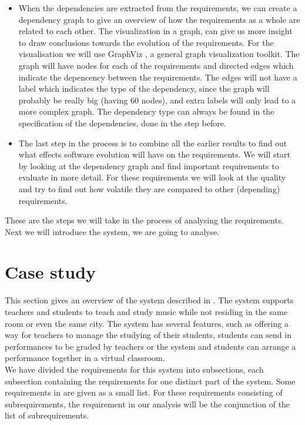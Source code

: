 \documentclass[a4paper,11pt]{article}
\begin{document}
\begin{itemize}
			\item When the dependencies are extracted from the requirements, we can create a dependency graph to give an overview of how the requirements as a whole are related to each other. The visualization in a graph, can give us more insight to draw conclusions towards the evolution of the requirements. For the visualisation we will use GraphViz \cite{graphviz}, a general graph visualization toolkit. The graph will have nodes for each of the requirements and directed edges which indicate the depencency between the requirements. The edges will not have a label which indicates the type of the dependency, since the graph will probably be really big (having 60 nodes), and extra labels will only lead to a more complex graph. The dependency type can always be found in the specification of the dependencies, done in the step before.
			\item The last step in the process is to combine all the earlier results to find out what effects software evolution will have on the requirements. We will start by looking at the dependency graph and find important requirements to evaluate in more detail. For these requirements we will look at the quality and try to find out how volatile they are compared to other (depending) requirements.
		\end{itemize} 
		
		These are the steps we will take in the process of analysing the requirements. Next we will introduce the system, we are going to analyse.
	
	\section{Case study}
	\label{sec:case}
		This section gives an overview of the system described in \cite{VEMUS}. The system supports teachers and students to teach and study music while not residing in the same room or even the same city. The system has several features, such as offering a way for teachers to manage the studying of their students, students can send in performances to be graded by teachers or the system and students can arrange a performance together in a virtual classroom. \\
		We have divided the requirements for this system into subsections, each subsection containing the requirements for one distinct part of the system. Some requirements in \cite{VEMUS} are given as a small list. For these requirements consisting of subrequirements, the requirement in our analysis will be the conjunction of the list of subrequirements. \\
	
\end{document}

